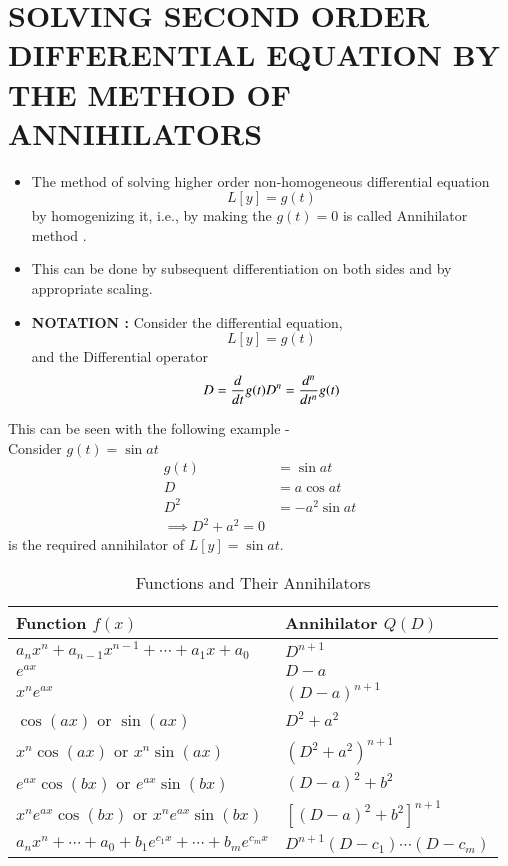 \documentclass[journal]{IEEEtran}
\begin{document}
\section{\textbf{SOLVING SECOND ORDER DIFFERENTIAL EQUATION BY THE METHOD OF ANNIHILATORS}}
\begin{itemize}
\item The method of solving higher order non-homogeneous differential equation
$$ L[y] = g(t) $$ by homogenizing it, i.e., by making the $g(t) = 0$ is called \color{blue} Annihilator method \color{black}.
\item This can be done by subsequent differentiation on both sides and by appropriate scaling.
\item \textbf{NOTATION : } Consider the differential equation, 
\begin{equation}
	L[y] = g(t)
\end{equation}
and the \color{blue} Differential operator \color{black}
\begin{equation}
	D = \frac{d}{dt} g(t) \\
	D^n = \frac{d^n}{dt^n} g(t)
\end{equation}
\end{itemize}
This can be seen with the following example - \\
Consider $g(t) = \sin{at}$ \\
\begin{align*}
	g(t) &= \sin{at} \\
	D &= a \cos{at} \\
	D^2 &= -a^2 \sin{at} \\
	\implies D^2 + a^2 = 0
\end{align*}
is the required annihilator of $L[y] = \sin{at}$.
\begin{table}[htbp]
\centering
\caption{Functions and Their Annihilators}
\begin{tabular}{|l|l|}
\hline
\textbf{Function $f(x)$} & \textbf{Annihilator $Q(D)$} \\
\hline
$a_n x^n + a_{n-1} x^{n-1} + \cdots + a_1 x + a_0$ & $D^{n+1}$ \\
\hline
$e^{ax}$ & $D - a$ \\
\hline
$x^n e^{ax}$ & $(D - a)^{n+1}$ \\
\hline
$\cos(ax)$ or $\sin(ax)$ & $D^2 + a^2$ \\
\hline
$x^n \cos(ax)$ or $x^n \sin(ax)$ & $(D^2 + a^2)^{n+1}$ \\
\hline
$e^{ax} \cos(bx)$ or $e^{ax} \sin(bx)$ & $(D-a)^2 + b^2$ \\
\hline
$x^n e^{ax} \cos(bx)$ or $x^n e^{ax} \sin(bx)$ & $\left[(D-a)^2 + b^2\right]^{n+1}$ \\
\hline
$a_n x^n + \cdots + a_0 + b_1 e^{c_1 x} + \cdots + b_m e^{c_m x}$ & $D^{n+1}(D-c_1) \cdots (D-c_m)$ \\
\hline
\end{tabular}
\end{table}
\end{document}
